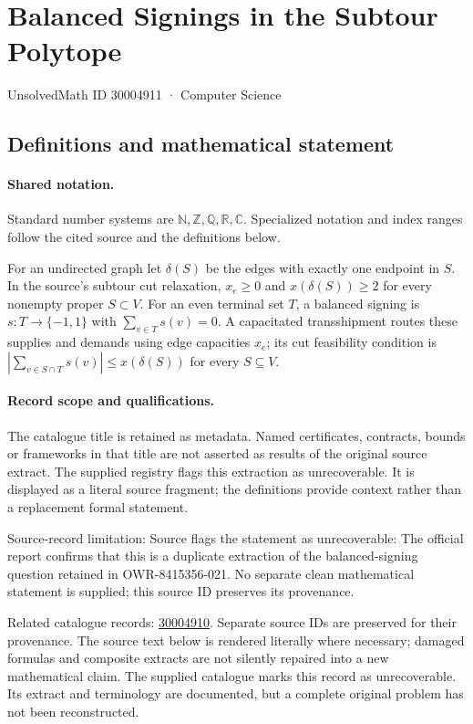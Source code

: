 \documentclass[11pt]{article}
\begin{document}
\setcounter{section}{30004910}
\section{Balanced Signings in the Subtour Polytope}\label{30004911}
{\small\sffamily UnsolvedMath ID 30004911 · Computer Science}
\subsection{Definitions and mathematical statement}

\paragraph{Shared notation.}Standard number systems are $\mathbb N,\mathbb Z,\mathbb Q,\mathbb R,\mathbb C$. Specialized notation and index ranges follow the cited source and the definitions below.


For an undirected graph let $\delta(S)$ be the edges with exactly one endpoint in $S$. In the source's subtour cut relaxation, $x_e\geq0$ and $x(\delta(S))\geq2$ for every nonempty proper $S\subset V$. For an even terminal set $T$, a balanced signing is $s:T\to\{-1,1\}$ with $\sum_{v\in T}s(v)=0$. A capacitated transshipment routes these supplies and demands using edge capacities $x_e$; its cut feasibility condition is $|\sum_{v\in S\cap T}s(v)|\leq x(\delta(S))$ for every $S\subseteq V$.
\paragraph{Record scope and qualifications.}
The catalogue title is retained as metadata. Named certificates, contracts, bounds or frameworks in that title are not asserted as results of the original source extract.
The supplied registry flags this extraction as unrecoverable. It is displayed as a literal source fragment; the definitions provide context rather than a replacement formal statement.

Source-record limitation: Source flags the statement as unrecoverable: The official report confirms that this is a duplicate extraction of the balanced-signing question retained in OWR-8415356-021. No separate clean mathematical statement is supplied; this source ID preserves its provenance.

Related catalogue records: \href{https://mehmetmars7.github.io/Erdosproblems-llm-hunter/problem.html?type=open_problems&id=30004910}{30004910}. Separate source IDs are preserved for their provenance.
The source text below is rendered literally where necessary; damaged formulas and composite extracts are not silently repaired into a new mathematical claim.
The supplied catalogue marks this record as unrecoverable. Its extract and terminology are documented, but a complete original problem has not been reconstructed.
\end{document}
